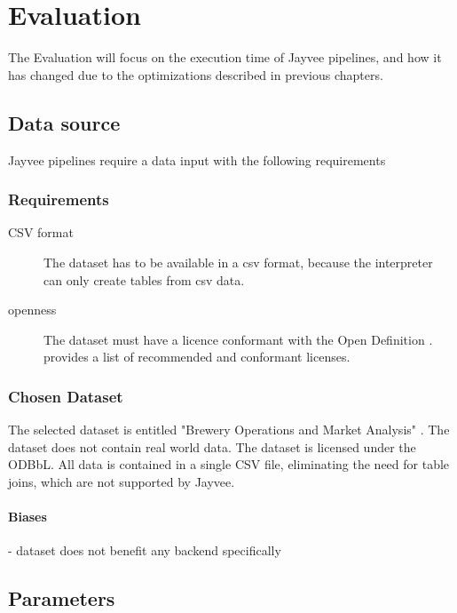 \chapter{Evaluation}
\label{chapter:Evaluation}

The Evaluation will focus on the execution time of Jayvee pipelines, and how it has changed due to the optimizations described in previous chapters.

\section{Data source}
\label{section:data_source}

Jayvee pipelines require a data input with the following requirements

\subsection{Requirements}
\label{subsection:data_source_requirements}
\begin{description}
	\item[\ac{CSV} format] The dataset has to be available in a csv format, because the interpreter can only create tables from csv data.
	\item[openness] The dataset must have a licence conformant with the Open Definition \autocite{opendefinition}.
	      \textcite{opendefinition:licences} provides a list of recommended and conformant licenses.
\end{description}


\subsection{Chosen Dataset}
The selected dataset is entitled "Brewery Operations and Market Analysis" \autocite{dataset}.
The dataset does not contain real world data.
The dataset is licensed under the \ac{ODBbL}.
All data is contained in a single \ac{CSV} file, eliminating the need for table joins, which are not supported by Jayvee.

\subsubsection{Biases}
- dataset does not benefit any backend specifically %

\section{Parameters}
\label{section:parameters}

